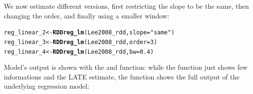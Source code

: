 \documentclass[english,nojss]{jss}\usepackage{graphicx, color}
\makeatletter
\newcommand{\hlfunctioncall}[1]{\textcolor[rgb]{0.501960784313725,0,0.329411764705882}{\textbf{#1}}}%
\newcommand{\hlstring}[1]{\textcolor[rgb]{0.6,0.6,1}{#1}}%
\newenvironment{kframe}{%
 \def\at@end@of@kframe{}%
 \ifinner\ifhmode%
  \def\at@end@of@kframe{\end{minipage}}%
  \begin{minipage}{\columnwidth}%
 \fi\fi%
 \def\FrameCommand##1{\hskip\@totalleftmargin \hskip-\fboxsep
 \colorbox{shadecolor}{##1}\hskip-\fboxsep
     \hskip-\linewidth \hskip-\@totalleftmargin \hskip\columnwidth}%
 \MakeFramed {\advance\hsize-\width
   \@totalleftmargin\z@ \linewidth\hsize
   \@setminipage}}%
 {\par\unskip\endMakeFramed%
 \at@end@of@kframe}
\newenvironment{knitrout}{}{} %
\makeatother
\begin{document}
We now estimate different versions, first restricting the slope to
be the same, then changing the order, and finally using a smaller
window:

\begin{knitrout}
\color{fgcolor}\begin{kframe}
\begin{alltt}
reg_linear_2 <- \hlfunctioncall{RDDreg_lm}(Lee2008_rdd, slope = \hlstring{"same"})
reg_linear_3 <- \hlfunctioncall{RDDreg_lm}(Lee2008_rdd, order = 3)
reg_linear_4 <- \hlfunctioncall{RDDreg_lm}(Lee2008_rdd, bw = 0.4)
\end{alltt}
\end{kframe}
\end{knitrout}


Model's output is shown with the  and 
function: while the  function just shows few informations
and the LATE estimate, the  function shows the full
output of the underlying regression model:
\end{document}
